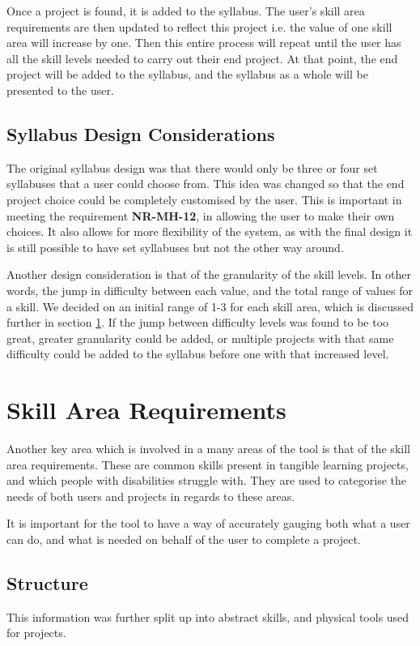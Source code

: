 \documentclass{l4proj}
\begin{document}
Once a project is found, it is added to the syllabus. The user's skill area requirements are then updated to reflect this project i.e. the value of one skill area will increase by one. Then this entire process will repeat until the user has all the skill levels needed to carry out their end project. At that point, the end project will be added to the syllabus, and the syllabus as a whole will be presented to the user. 

\subsection{Syllabus Design Considerations}
The original syllabus design was that there would only be three or four set syllabuses that a user could choose from. This idea was changed so that the end project choice could be completely customised by the user. This is important in meeting the requirement \textbf{NR-MH-12}, in allowing the user to make their own choices. It also allows for more flexibility of the system, as with the final design it is still possible to have set syllabuses but not the other way around. 

Another design consideration is that of the granularity of the skill levels. In other words, the jump in difficulty between each value, and the total range of values for a skill. We decided on an initial range of 1-3 for each skill area, which is discussed further in section \ref{design-skill-area}. If the jump between difficulty levels was found to be too great, greater granularity could be added, or multiple projects with that same difficulty could be added to the syllabus before one with that increased level.  

\section{Skill Area Requirements}
\label{design-skill-area}
Another key area which is involved in a many areas of the tool is that of the skill area requirements. These are common skills present in tangible learning projects, and which people with disabilities struggle with. They are used to categorise the needs of both users and projects in regards to these areas.

It is important for the tool to have a way of accurately gauging both what a user can do, and what is needed on behalf of the user to complete a project.

\subsection{Structure}
This information was further split up into abstract skills, and physical tools used for projects. 
\end{document}
